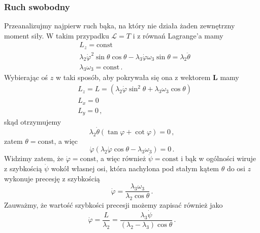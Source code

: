 \documentclass[../main.tex]{subfiles}
\begin{document}
\subsubsection*{Ruch swobodny}
Przeanalizujmy najpierw ruch bąka, na który nie działa żaden zewnętrzny moment siły. W takim
przypadku \(\mathcal{L}=T\) i z równań Lagrange'a mamy
\begin{equation*}
    \begin{split}
        &L_z=\text{const}\\
        &\lambda_2\dot{\varphi}^2\sin\theta\cos\theta-\lambda_3\dot{\varphi}\omega_3\sin\theta=\lambda_2\ddot\theta\\
        &\lambda_3\omega_3=\text{const}\,.
    \end{split}
\end{equation*}
Wybierając oś \(z\) w taki sposób, aby pokrywała się ona z wektorem \(\mathbf{L}\) mamy
\begin{equation*}
\begin{split}
    &L_z=L=\left(\lambda_2\dot\varphi\sin^2\theta +\lambda_3\omega_3\cos\theta\right)\\
    &L_x=0\\
    &L_y=0\,,
\end{split}
\end{equation*}
skąd otrzymujemy
\begin{equation*}
    \lambda_2\dot\theta(\tan\varphi+\cot\varphi)=0\,,
\end{equation*}
zatem \(\theta=\text{const}\), a więc
    \begin{equation*}
        \dot\varphi(\lambda_2\dot{\varphi}\cos\theta-\lambda_3\omega_3)=0\,.
    \end{equation*}
    Widzimy zatem, że \(\dot\varphi=\text{const}\), a więc również \(\dot\psi=\text{const}\) i bąk w
    ogólności wiruje z szybkością \(\dot\psi\) wokół własnej osi, która nachylona pod stałym kątem
    \(\theta\) do osi \(z\) wykonuje precesję z szybkością
    \begin{equation*}
        \dot\varphi=\frac{\lambda_3\omega_3}{\lambda_2\cos\theta}\,.
    \end{equation*}
    Zauważmy, że wartość szybkości precesji możemy zapisać również jako
    \begin{equation*}
        \dot\varphi=\frac{L}{\lambda_2}=\frac{\lambda_3\dot\psi}{(\lambda_2-\lambda_3)\cos\theta}\,.
    \end{equation*}
\end{document}
